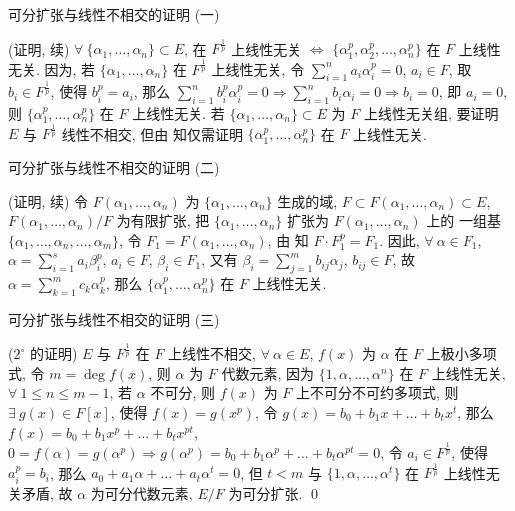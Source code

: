 \begin{frame}{可分扩张与线性不相交的证明 (一)}

\startproof[bg=yellow, fg=red](证明, 续)
 $\forall\ \{ \alpha_1, \dots, \alpha_n \} \subset E$,
在 $F^{\frac{1}{p}}$ 上线性无关
$\iff$ $\{ \alpha_1^p, \alpha_2^p, \dots, \alpha_n^p \}$ 在 $F$ 上线性无关.
因为, 若 $\{ \alpha_1, \dots, \alpha_n \}$ 在 $F^{\frac{1}{p}}$ 上线性无关,
令 $\sum_{i=1}^{n} a_i \alpha_i^p = 0$, $a_i \in F$,
取 $b_i \in F^{\frac{1}{p}}$, 使得 $b_i^p = a_i$,
那么 $\sum_{i=1}^{n} b_i^p \alpha_i^p = 0
\Longrightarrow \sum_{i=1}^{n} b_i \alpha_i = 0
\Longrightarrow b_i = 0$, 即 $a_i = 0$,
则 $\{ \alpha_1^p, \dots, \alpha_n^p \}$ 在 $F$ 上线性无关.
若 $\{ \alpha_1, \dots, \alpha_n \} \subset E$ 为 $F$ 上线性无关组,
要证明 $E$ 与 $F^{\frac{1}{p}}$ 线性不相交, 但由  知仅需证明
$\{ \alpha_1^p, \dots, \alpha_n^p \}$ 在 $F$ 上线性无关.

\end{frame}


\begin{frame}{可分扩张与线性不相交的证明 (二)}

\startproof[bg=yellow, fg=red](证明, 续)
令 $F(\alpha_1, \dots, \alpha_n)$ 为 $\{ \alpha_1, \dots, \alpha_n \}$ 生成的域,
$F \subset F(\alpha_1, \dots, \alpha_n) \subset E$,
$F(\alpha_1, \dots, \alpha_n)/F$ 为有限扩张,
把 $\{ \alpha_1, \dots, \alpha_n \}$ 扩张为 $F(\alpha_1, \dots, \alpha_n)$ 上的
一组基 $\{ \alpha_1, \dots, \alpha_n, \dots, \alpha_m \}$,
令 $F_1 = F(\alpha_1, \dots, \alpha_n)$, 由  知 $F \cdot F_1^p = F_1$.
因此, $\forall\ \alpha \in F_1$,
$\alpha = \sum_{i=1}^{s} a_i \beta_i^p$, $a_i \in F$, $\beta_i \in F_1$,
又有 $\beta_i = \sum_{j=1}^{m} b_{ij} \alpha_j$, $b_{ij} \in F$,
故 $\alpha = \sum_{k=1}^{m} c_k \alpha_k^p$,
那么 $\{ \alpha_1^p, \dots, \alpha_n^p \}$ 在 $F$ 上线性无关.

\end{frame}


\begin{frame}{可分扩张与线性不相交的证明 (三)}

\startproof[bg=yellow, fg=red]($2^{\circ}$ 的证明)
$E$ 与 $F^{\frac{1}{p}}$ 在 $F$ 上线性不相交,
$\forall\ \alpha \in E$, $f(x)$ 为 $\alpha$ 在 $F$ 上极小多项式,
令 $m = \deg f(x)$,
则 $\alpha$ 为 $F$ 代数元素,
因为 $\{1, \alpha, \dots, \alpha^n\}$ 在 $F$ 上线性无关, $\forall\ 1 \leq n \leq m-1$,
若 $\alpha$ 不可分, 则 $f(x)$ 为 $F$ 上不可分不可约多项式,
则 $\exists\ g(x) \in F[x]$, 使得 $f(x) = g(x^p)$,
令 $g(x) = b_0 + b_1 x + \dots + b_t x^t$,
那么 $f(x) = b_0 + b_1 x^p + \dots + b_t x^{pt}$,
$0 = f(\alpha) = g(\alpha^p) \Longrightarrow g(\alpha^p) = b_0 + b_1 \alpha^p
+ \dots + b_t \alpha^{pt} = 0$,
令 $a_i \in F^{\frac{1}{p}}$, 使得 $a_i^p = b_i$, 那么
$a_0 + a_1 \alpha + \dots + a_t \alpha^t = 0$,
但 $t < m$ 与 $\{1, \alpha, \dots, \alpha^t\}$ 在 $F^{\frac{1}{p}}$
上线性无关矛盾,
故 $\alpha$ 为可分代数元素, $E/F$ 为可分扩张.
\qed

\end{frame}



